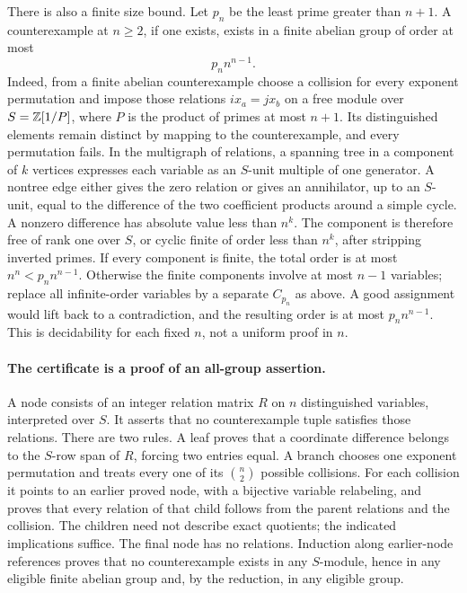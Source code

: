 There is also a finite size bound. Let \(p_n\) be the least prime
greater than \(n+1\). A counterexample at \(n\ge2\), if one exists,
exists in a finite abelian group of order at most
\[
 p_n n^{n-1}.
\]
Indeed, from a finite abelian counterexample choose a collision
for every exponent permutation and impose those relations
\(ix_a=jx_b\) on a free module over
\(S=\mathbb Z[1/P]\), where \(P\) is the product of primes at most \(n+1\).
Its distinguished elements remain distinct by mapping to the
counterexample, and every permutation fails. In the multigraph
of relations, a spanning tree in a component of \(k\) vertices
expresses each variable as an \(S\)-unit multiple of one generator.
A nontree edge either gives the zero relation or gives an
annihilator, up to an \(S\)-unit, equal to the difference of the
two coefficient products around a simple cycle. A nonzero difference
has absolute value less than \(n^k\).
The component is therefore free of rank one over \(S\), or cyclic
finite of order less than \(n^k\), after stripping inverted primes.
If every component is finite, the total order is at most \(n^n<
p_nn^{n-1}\). Otherwise the finite components involve at most
\(n-1\) variables; replace all infinite-order variables by a separate
\(C_{p_n}\) as above. A good assignment would lift back to a
contradiction, and the resulting order is at most \(p_nn^{n-1}\).
This is decidability for each fixed \(n\), not a uniform proof in \(n\).

\paragraph{The certificate is a proof of an all-group assertion.}
A node consists of an integer relation matrix \(R\) on \(n\)
distinguished variables, interpreted over \(S\). It asserts that
no counterexample tuple satisfies those relations. There are two
rules. A leaf proves that a coordinate difference belongs to the
\(S\)-row span of \(R\), forcing two entries equal. A branch chooses
one exponent permutation and treats every one of its
\(\binom n2\) possible collisions. For each collision it points
to an earlier proved node, with a bijective variable relabeling,
and proves that every relation of that child follows from the
parent relations and the collision. The children need not describe
exact quotients; the indicated implications suffice.
The final node has no relations. Induction along earlier-node
references proves that no counterexample exists in any \(S\)-module,
hence in any eligible finite abelian group and, by the reduction,
in any eligible group.

